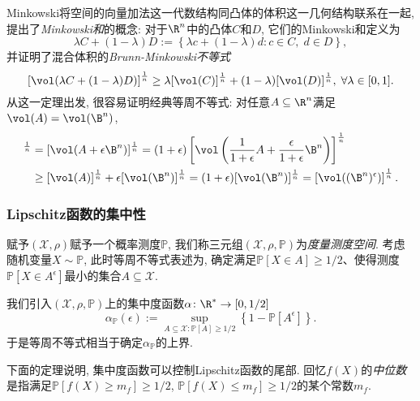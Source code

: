 Minkowski将空间的向量加法这一代数结构同凸体的体积这一几何结构联系在一起, 提出了\emph{Minkowski和}的概念: 
对于$\R^n$中的凸体$C$和$D$, 它们的Minkowski和定义为
\begin{equation*}
	\lambda C + (1 - \lambda) D := \left\{ \lambda c + (1 - \lambda) d \colon c \in C,\; d \in D \right\}, 
\end{equation*}
并证明了混合体积的\emph{Brunn-Minkowski不等式}
\begin{equation*}
	\left[ \vol(\lambda C + (1-\lambda) D)  \right]^{\frac1n}
	\geq \lambda [\vol(C)]^{\frac1n} + (1-\lambda) [\vol(D)]^{\frac1n},\;
	\forall \lambda \in [0,1]. 
\end{equation*}
从这一定理出发, 很容易证明经典等周不等式: 对任意$A \subseteq \R^n$满足$\vol(A) = \vol(\B^n)$, 
\begin{align*}
	[\vol(A^{\epsilon})]^{\frac1n}
	&= [\vol(A + \epsilon \B^n)]^{\frac1n}
	= (1+\epsilon) \left[\vol\left(\frac{1}{1+\epsilon} A + \frac{\epsilon}{1+\epsilon} \B^n\right)\right]^{\frac1n} \\
	&\geq [\vol(A)]^{\frac1n} + \epsilon [\vol(\B^n)]^{\frac1n} 
	= (1+\epsilon) [\vol(\B^n)]^{\frac1n} 
	= \left[ \vol((\B^n)^{\epsilon}) \right]^{\frac1n}. 
\end{align*}

\subsubsection{Lipschitz函数的集中性}

赋予$(\mathcal{X}, \rho)$赋予一个概率测度$\mathbb{P}$, 我们称三元组$(\mathcal{X}, \rho, \mathbb{P})$为\emph{度量测度空间}. 
考虑随机变量$X \sim \mathbb{P}$,  此时等周不等式表述为, 确定满足$\mathbb{P}[X \in A] \geq 1/2$、使得测度$\mathbb{P}[X \in A^{\epsilon}]$最小的集合$A \subseteq \mathcal{X}$.

我们引入$(\mathcal{X}, \rho, \mathbb{P})$上的集中度函数$\alpha \colon \R^* \to [0, 1/2]$
\begin{equation*}
	\alpha_{\mathbb{P}}(\epsilon)
	:= \sup_{A \subseteq \mathcal{X} \colon \mathbb{P}[A] \geq 1/2} \left\{ 1 - \mathbb{P}[A^{\epsilon}] \right\}. 
\end{equation*}
于是等周不等式相当于确定$\alpha_{\mathbb{P}}$的上界. 

下面的定理说明, 集中度函数可以控制Lipschitz函数的尾部. 
回忆$f(X)$的\emph{中位数}是指满足$\mathbb{P}[f(X) \geq m_f] \geq 1/2$, $\mathbb{P}[f(X) \leq m_f] \geq 1/2$的某个常数$m_f$. 

